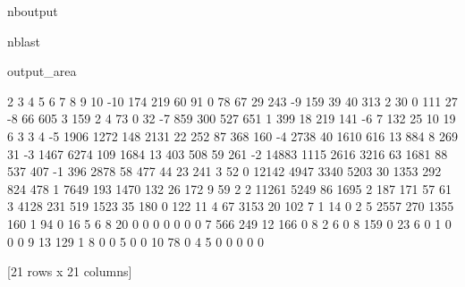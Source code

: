 \documentclass[letterpaper,10pt,english]{sphinxmanual}
\begin{document}
\begin{sphinxuseclass}{nboutput}
\begin{sphinxuseclass}{nblast}
{\begin{sphinxuseclass}{output_area}
\begin{sphinxuseclass}{}
\begin{sphinxVerbatim}[commandchars=\\\{\}]
        2     3     4     5    6     7    8    9    10
-10    174   219    60    91    0    78   67   29  243
-9     159    39    40   313    2    30    0  111   27
-8      66   605     3   159    2     4   73    0   32
-7     859   300   527   651    1   399   18  219  141
-6       7   132    25    10   19     6    3    3    4
-5    1906  1272   148  2131   22   252   87  368  160
-4    2738    40  1610   616   13   884    8  269   31
-3    1467  6274   109  1684   13   403  508   59  261
-2   14883  1115  2616  3216   63  1681   88  537  407
-1     396  2878    58   477   44    23  241    3   52
 0   12142  4947  3340  5203   30  1353  292  824  478
 1    7649   193  1470   132   26   172    9   59    2
 2   11261  5249    86  1695    2   187  171   57   61
 3    4128   231   519  1523   35   180    0  122   11
 4      67  3153    20   102    7     1   14    0    2
 5    2557   270  1355   160    1    94    0   16    5
 6       8    20     0     0    0     0    0    0    0
 7     566   249    12   166    0     8    2    6    0
 8     159     0    23     6    0     1    0    0    0
 9      13   129     1     8    0     0    5    0    0
 10     78     0     4     5    0     0    0    0    0

[21 rows x 21 columns]
\end{sphinxVerbatim}



\end{sphinxuseclass}
\end{sphinxuseclass}
}

\end{sphinxuseclass}
\end{sphinxuseclass}
\end{document}
